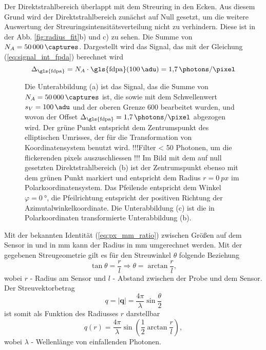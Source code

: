 \noindent
Der Direktstrahlbereich überlappt mit dem Streuring in den Ecken. Aus diesem Grund wird der Direktstrahlbereich zunächst auf Null gesetzt, um die weitere Auswertung der Streuringsintensitätsverteilung nicht zu verhindern. Diese ist in der Abb. \ref{fig:radius_fit}b) und c) zu sehen. Die Summe von $N_A = \SI{50000}{\captures}$. Dargestellt wird das Signal, das mit der Gleichung (\ref{eq:signal_int_fpda}) berechnet wird
\begin{equation}
    \Delta_\text{\gls{fdpa}} = N_A\cdot \text{\gls{fdpa}}(\SI{100}{\adu}) = \SI{1,7}{\photons\per\pixel}
\end{equation}
\begin{figure}[H]
    \centering
    
    \caption{Die Unterabbildung (a) ist das Signal, das die Summe von $N_A = \SI{50000}{\captures}$ ist, die sowie mit dem Schwellenwert $s_V = \SI{100}{\adu}$ und der oberen Grenze \SI{600}{\adu} bearbeitet wurden, und wovon der Offset $\Delta_\text{\gls{fdpa}} = \SI{1,7}{\photons\per\pixel}$ abgezogen wird. Der grüne Punkt entspricht dem Zentrumspunkt des elliptischen Umrisses, der für die Transformation von Koordinatensystem benutzt wird. !!!Filter < 50 Photonen, um die flickerenden pixels auszuschliessen !!! Im Bild mit dem auf null gesetzten Direktstrahlbereich (b) ist der Zentrumspunkt ebenso mit dem grünen Punkt markiert und entspricht dem Radius $r=\SI{0}{px}$ im Polarkoordinatensystem. Das Pfeilende entspricht dem Winkel $\varphi = \SI{0}{\degree}$, die Pfeilrichtung entspricht der positiven Richtung der Azimutalwinkelkoordinate. Die Unterabbildung (c) ist die in Polarkoordinaten transformierte Unterabbildung (b).}
    \label{fig:th-100-200-maske-radial-transform}
\end{figure}
\noindent
Mit der bekannten Identität (\ref{eq:px_mm_ratio}) zwischen Größen auf dem Sensor in \si{\px} und in \si{\milli\meter} kann der Radius in \si{\milli\meter} umgerechnet werden. Mit der gegebenen Streugeometrie gilt es für den Streuwinkel $\theta$  folgende Beziehung
\begin{equation}
    \tan{\theta} = \frac{r}{l} \Rightarrow \theta = \arctan \frac{r}{l},
\end{equation}
wobei $r$ - Radius am Sensor und $l$ - Abstand zwischen der Probe und dem Sensor. Der Streuvektorbetrag 
\begin{equation}
    q = \left|\mathbf{q}\right| = \frac{4\pi}{\lambda}\sin{\frac{\theta}{2}}
\end{equation}
ist somit als Funktion des Radiusses $r$ darstellbar
\begin{equation}
    q(r) = \frac{4\pi}{\lambda}\sin\left(\frac{1}{2}\arctan\frac{r}{l}\right),
    \label{eq:streuvektor_von_radius}
\end{equation}
wobei $\lambda$ - Wellenlänge von einfallenden Photonen.

